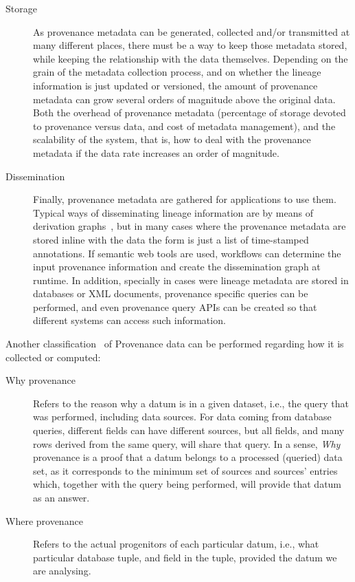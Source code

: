 \begin{description}
			\item[Storage] As provenance metadata can be generated,
			collected and/or transmitted at many different places,
			there must be a way to keep those metadata stored,
			while keeping the relationship with the data
			themselves. Depending on the grain of the metadata
			collection process, and on whether the lineage
			information is just updated or versioned, the amount of
			provenance metadata can grow several orders of
			magnitude above the original data. Both the overhead of
			provenance metadata (percentage of storage devoted to
			provenance versus data, and cost of metadata
			management), and the scalability of the system, that
			is, how to deal with the provenance metadata if the
			data rate increases an order of magnitude.
			
			\item[Dissemination] Finally, provenance metadata are
			gathered for applications to use them. Typical ways of
			disseminating lineage information are by means of
			derivation graphs~\todoinlinesuspended{\citeneeded},
			but in many cases where
			the provenance metadata are stored inline with the data
			the form is just a list of time-stamped annotations. If
			semantic web tools are used, workflows can determine
			the input provenance information and create the
			dissemination graph at runtime. In addition, specially
			in cases were lineage metadata are stored in databases
			or XML documents, provenance specific queries can be
			performed, and even provenance query APIs can be created
			so that different systems can access such information.
			
		\end{description}
	
		Another classification~\cite{Buneman:2001fc}
		of Provenance data can be performed regarding how it
		is collected or computed:
		
		\begin{description}
			\item[Why provenance] Refers to the reason why a datum
			is in a given dataset, i.e., the query that was
			performed, including data sources. For data coming from
			database queries, different fields can have different
			sources, but all fields, and many rows derived from the
			same query, will share that query. In a sense,
			\emph{Why} provenance is a proof that a datum belongs
			to a processed (queried) data set, as it corresponds to
			the minimum set of sources and sources' entries which,
			together with the query being performed, will provide
			that datum as an answer.
			
			\item[Where provenance] Refers to the actual
			progenitors of each particular datum, i.e., what
			particular database tuple, and field in the tuple,
			provided the datum we are analysing.
		\end{description}
		
